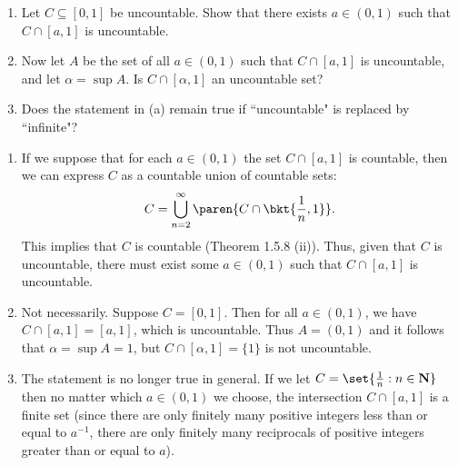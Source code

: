\documentclass{lew98_solutions}
\begin{document}
\begin{exercise}
\label{ex:1.5.10}
    \begin{enumerate}
        \item Let \( C \subseteq [0, 1] \) be uncountable. Show that there exists \( a \in (0, 1) \) such that \( C \cap [a, 1] \) is uncountable.

        \item Now let \( A \) be the set of all \( a \in (0, 1) \) such that \( C \cap [a, 1] \) is uncountable, and let \( \alpha = \sup A \). Is \( C \cap [\alpha, 1] \) an uncountable set?

        \item Does the statement in (a) remain true if ``uncountable" is replaced by ``infinite"?
    \end{enumerate}
\end{exercise}

\begin{solution}
    \begin{enumerate}
        \item If we suppose that for each \( a \in (0, 1) \) the set \( C \cap [a, 1] \) is countable, then we can express \( C \) as a countable union of countable sets:
        \[
            C = \bigcup_{n=2}^{\infty} \paren{ C \cap \bkt{ \frac{1}{n}, 1 } }.
        \]
        This implies that \( C \) is countable (Theorem 1.5.8 (ii)). Thus, given that \( C \) is uncountable, there must exist some \( a \in (0, 1) \) such that \( C \cap [a, 1] \) is uncountable. 

        \item Not necessarily. Suppose \( C = [0, 1] \). Then for all \( a \in (0, 1) \), we have \( C \cap [a, 1] = [a, 1] \), which is uncountable. Thus \( A = (0, 1) \) and it follows that \( \alpha = \sup A = 1 \), but \( C \cap [\alpha, 1] = \{ 1 \} \) is not uncountable.

        \item The statement is no longer true in general. If we let \( C = \set{ \tfrac{1}{n} : n \in \N } \) then no matter which \( a \in (0, 1) \) we choose, the intersection \( C \cap [a, 1] \) is a finite set (since there are only finitely many positive integers less than or equal to \( a^{-1} \), there are only finitely many reciprocals of positive integers greater than or equal to \( a \)).
    \end{enumerate}
\end{solution}
\end{document}
